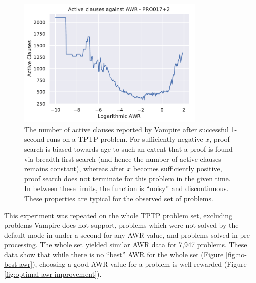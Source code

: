 \documentclass{llncs}
\begin{document}
\begin{figure}[t]
	\centering
	\includegraphics[width=0.8\textwidth]{example-optimal-awr}
	\caption{
The number of active clauses reported by Vampire after successful 1-second runs on a TPTP problem.
For sufficiently negative \(x\), proof search is biased towards age to such an extent that a proof is found via breadth-first search (and hence the number of active clauses remains constant), whereas after \(x\) becomes sufficiently positive, proof search does not terminate for this problem in the given time.
In between these limits, the function is ``noisy'' and discontinuous.
These properties are typical for the observed set of problems.
}
	\label{fig:example-optimal-awr}
\end{figure}

This experiment was repeated on the whole TPTP problem set, excluding problems Vampire does not support, problems which were not solved by the default mode in under a second for any AWR value, and problems solved in pre-processing.
The whole set yielded similar AWR data for 7,947 problems.
These data show that while there is no ``best'' AWR for the whole set (Figure \ref{fig:no-best-awr}), choosing a good AWR value for a problem is well-rewarded (Figure \ref{fig:optimal-awr-improvement}).

\noindent
\\
\end{document}
